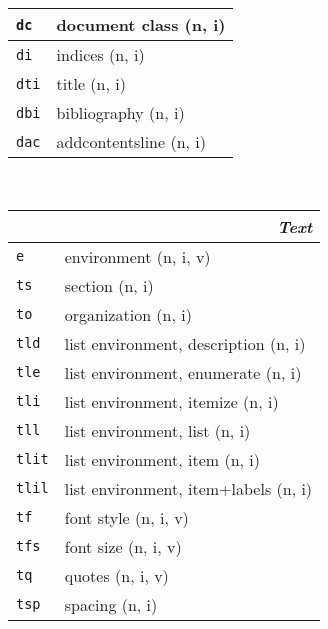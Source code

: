 \documentclass[oneside,10pt,landscape,DIV16]{scrartcl}
\newcommand{\Map}[1] {\textbf{\textasciiacute}\texttt{#1}}
\begin{document}
\begin{multicols}{3}
\begin{center}
\begin{tabular}[]{|p{11mm}|p{60mm}|}
\hline     \Map{dc}  &  document class              \hfill (n, i)\\
\hline     \Map{di}  &  indices                     \hfill (n, i)\\
\hline     \Map{dti} &  title                       \hfill (n, i)\\
\hline     \Map{dbi} &  bibliography                \hfill (n, i)\\
\hline     \Map{dac} &  addcontentsline             \hfill (n, i)\\
\hline
%
\end{tabular}\\
%
\begin{tabular}[]{|p{11mm}|p{60mm}|}
\hline
\multicolumn{2}{|r|}{\textsl{\textbf{T}ext}}                 \\[1.0ex]
\hline \Map{e}    & environment                    \hfill (n, i, v)\\
\hline \Map{ts}   & section                        \hfill (n, i)\\
\hline \Map{to}   & organization                   \hfill (n, i)\\
\hline \Map{tld}  & list environment, description  \hfill (n, i)\\
\hline \Map{tle}  & list environment, enumerate    \hfill (n, i)\\
\hline \Map{tli}  & list environment, itemize      \hfill (n, i)\\
\hline \Map{tll}  & list environment, list         \hfill (n, i)\\
\hline \Map{tlit} & list environment, item         \hfill (n, i)\\
\hline \Map{tlil} & list environment, item+labels  \hfill (n, i)\\
\hline \Map{tf}   & font style                     \hfill (n, i, v)\\
\hline \Map{tfs}  & font size                      \hfill (n, i, v)\\
\hline \Map{tq}   & quotes                         \hfill (n, i, v)\\
\hline \Map{tsp}  & spacing                        \hfill (n, i)\\

\end{tabular}
\end{center}
\end{multicols}
\end{document}
